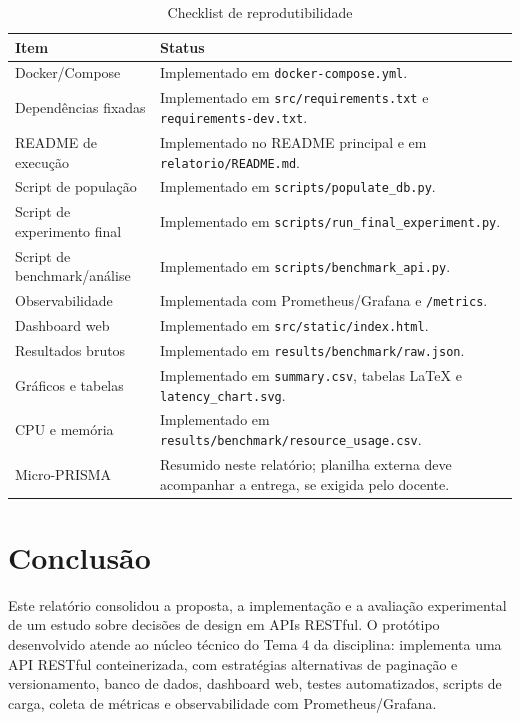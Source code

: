 \documentclass[journal]{IEEEtran}
\begin{document}
\begin{table}[htbp]
\caption{Checklist de reprodutibilidade}
\label{tab:checklist}
\centering
\renewcommand{\arraystretch}{1.2}
\begin{tabularx}{\columnwidth}{lX}
\toprule
\textbf{Item} & \textbf{Status} \\
\midrule
Docker/Compose & Implementado em \texttt{docker-compose.yml}. \\
Dependências fixadas & Implementado em \texttt{src/requirements.txt} e \texttt{requirements-dev.txt}. \\
README de execução & Implementado no README principal e em \texttt{relatorio/README.md}. \\
Script de população & Implementado em \texttt{scripts/populate\_db.py}. \\
Script de experimento final & Implementado em \texttt{scripts/run\_final\_experiment.py}. \\
Script de benchmark/análise & Implementado em \texttt{scripts/benchmark\_api.py}. \\
Observabilidade & Implementada com Prometheus/Grafana e \texttt{/metrics}. \\
Dashboard web & Implementado em \texttt{src/static/index.html}. \\
Resultados brutos & Implementado em \texttt{results/benchmark/raw.json}. \\
Gráficos e tabelas & Implementado em \texttt{summary.csv}, tabelas LaTeX e \texttt{latency\_chart.svg}. \\
CPU e memória & Implementado em \texttt{results/benchmark/resource\_usage.csv}. \\
Micro-PRISMA & Resumido neste relatório; planilha externa deve acompanhar a entrega, se exigida pelo docente. \\
\bottomrule
\end{tabularx}
\end{table}


\section{Conclusão}

Este relatório consolidou a proposta, a implementação e a avaliação experimental de um estudo sobre decisões de design em APIs RESTful. O protótipo desenvolvido atende ao núcleo técnico do Tema 4 da disciplina: implementa uma API RESTful conteinerizada, com estratégias alternativas de paginação e versionamento, banco de dados, dashboard web, testes automatizados, scripts de carga, coleta de métricas e observabilidade com Prometheus/Grafana.
\end{document}
